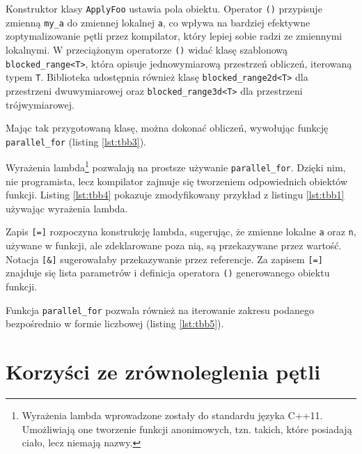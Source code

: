 \documentclass[12pt, twoside, openany]{report}
\begin{document}
Konstruktor klasy \texttt{ApplyFoo} ustawia pola obiektu. Operator \texttt{()} przypisuje zmienną \texttt{my\_a} do zmiennej lokalnej \texttt a, co wpływa na bardziej efektywne zoptymalizowanie pętli przez kompilator, który lepiej sobie radzi ze zmiennymi lokalnymi. W przeciążonym operatorze \texttt{()} widać klasę szablonową \texttt{blocked\_range<T>}, która opisuje jednowymiarową przestrzeń obliczeń, iterowaną typem \texttt{T}. Biblioteka udostępnia również klasę \texttt{blocked\_range2d<T>} dla przestrzeni dwuwymiarowej oraz \texttt{blocked\_range3d<T>} dla przestrzeni trójwymiarowej.

Mając tak przygotowaną klasę, można dokonać obliczeń, wywołując funkcję\\\texttt{parallel\_for} (listing \ref{lst:tbb3}).



Wyrażenia lambda\footnote{Wyrażenia lambda wprowadzone zostały do standardu języka C++11. Umożliwiają one tworzenie funkcji anonimowych, tzn. takich, które posiadają ciało, lecz niemają nazwy.} pozwalają na prostsze używanie \texttt{parallel\_for}. Dzięki nim, nie programista, lecz kompilator zajmuje się tworzeniem odpowiednich obiektów funkcji. Listing \ref{lst:tbb4} pokazuje zmodyfikowany przykład z listingu \ref{lst:tbb1} używając wyrażenia lambda.



Zapis \texttt{[=]} rozpoczyna konstrukcję lambda, sugerując, że zmienne lokalne \texttt a oraz \texttt n, używane w funkcji, ale zdeklarowane poza nią, są przekazywane przez wartość. Notacja \texttt{[\&]} sugerowałaby przekazywanie przez referencje. Za zapisem \texttt{[=]} znajduje się lista parametrów i definicja operatora \texttt{()} generowanego obiektu funkcji.

Funkcja \texttt{parallel\_for} pozwala również na iterowanie zakresu podanego bezpośrednio w formie liczbowej (listing \ref{lst:tbb5}).



\section{Korzyści ze zrównoleglenia pętli}
\end{document}
